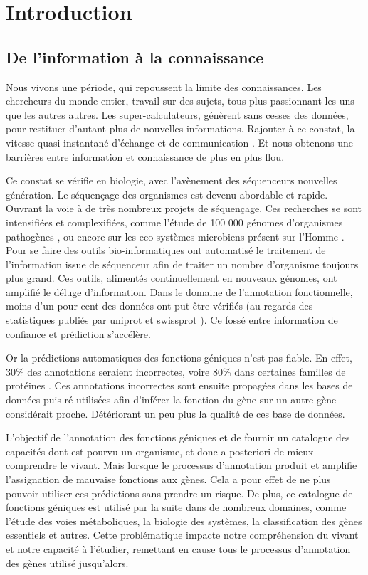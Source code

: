 \chapter{Introduction}
\section{De l'information à la connaissance}
Nous vivons une période, qui repoussent la limite des connaissances. Les chercheurs du monde entier, travail sur des sujets, tous plus passionnant les uns que les autres autres. Les super-calculateurs, génèrent sans cesses des données, pour restituer d'autant plus de nouvelles informations. Rajouter à ce constat, la vitesse quasi instantané d'échange et de communication . Et nous obtenons une barrières entre information et connaissance de plus en plus flou.

Ce constat se vérifie en biologie, avec l'avènement des séquenceurs nouvelles génération. Le séquençage des organismes est devenu abordable et rapide. Ouvrant la voie à de très nombreux projets de séquençage. Ces recherches se sont intensifiées et complexifiées, comme l'étude de 100 000 génomes d'organismes pathogènes \cite{100kfoodborne}, ou encore sur les eco-systèmes microbiens présent sur l'Homme \cite{hmp}. Pour se faire des outils bio-informatiques ont automatisé le traitement de l'information issue de séquenceur afin de traiter un nombre d'organisme toujours plus grand. Ces outils, alimentés continuellement en nouveaux génomes, ont amplifié le déluge d'information. Dans le domaine de l'annotation fonctionnelle, moins d'un pour cent des données ont put être vérifiés (au regards des statistiques publiés par uniprot et swissprot \parencites{uniprot_stat}{expasy_stat} ). Ce fossé entre information de confiance et prédiction s'accélère.

Or la prédictions automatiques des fonctions géniques n'est pas fiable. En effet, 30\% des annotations seraient incorrectes, voire 80\% dans certaines familles de protéines \parencites{devos2001intrinsic}{schnoes2009annotation}. Ces annotations incorrectes sont ensuite propagées dans les bases de données puis ré-utilisées afin d'inférer la fonction du gène sur un autre  gène considérait proche. Détériorant un peu plus la qualité de ces base de données.

L'objectif de l'annotation des fonctions géniques et de fournir un catalogue des capacités dont est pourvu un organisme, et donc a posteriori de mieux comprendre le vivant. Mais lorsque le processus d'annotation produit et amplifie l'assignation de mauvaise fonctions aux gènes. Cela a pour effet de ne plus pouvoir utiliser ces prédictions sans prendre un risque. De plus, ce catalogue de fonctions géniques est utilisé par la suite dans de nombreux domaines, comme l'étude des voies métaboliques, la biologie des systèmes, la classification des gènes essentiels et autres. Cette problématique impacte notre compréhension du vivant et notre capacité à l'étudier, remettant en cause tous le processus d'annotation des gènes utilisé jusqu'alors.

